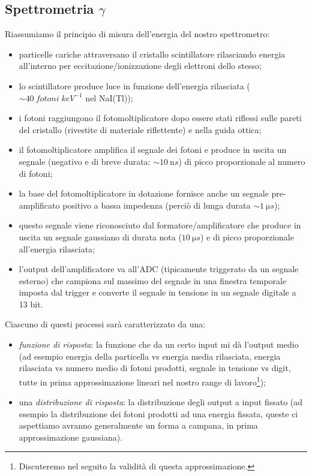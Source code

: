 \subsection{Spettrometria $\gamma$}
Riassumiamo il principio di misura dell'energia del nostro spettrometro:
\begin{itemize}
	\item particelle cariche attraversano il cristallo scintillatore rilasciando energia all'interno per eccitazione/ionizzazione degli elettroni dello stesso;
	\item lo scintillatore produce luce in funzione dell'energia rilasciata ($\sim \SI{40}{fotoni \; keV^{-1}}$ nel NaI(Tl));
	\item i fotoni raggiungono il fotomoltiplicatore dopo essere stati riflessi sulle pareti del cristallo (rivestite di materiale riflettente) e nella guida ottica;
	\item il fotomoltiplicatore amplifica il segnale dei fotoni e produce in uscita un segnale (negativo e di breve durata: $\sim \SI{10}{\nano s}$) di picco proporzionale al numero di fotoni;
	\item la base del fotomoltiplicatore in dotazione fornisce anche un segnale pre-amplificato positivo a bassa impedenza (perciò di lunga durata $\sim \SI{1}{\micro s}$);
	\item questo segnale viene riconosciuto dal formatore/amplificatore che produce in uscita un segnale gaussiano di durata nota ($\SI{10}{\micro s}$) e di picco proporzionale all'energia rilasciata;
	\item l'output dell'amplificatore va all'ADC (tipicamente triggerato da un segnale esterno) che campiona sul massimo del segnale in una finestra temporale imposta dal trigger e converte il segnale in tensione in un segnale digitale a 13 bit.
\end{itemize}
Ciascuno di questi processi sarà caratterizzato da una:
\begin{itemize}
	\item\emph{funzione di risposta}: la funzione che da un certo input mi dà l'output medio (ad esempio energia della particella vs energia media rilasciata, energia rilasciata vs numero medio di fotoni prodotti, segnale in tensione vs digit, tutte in prima approssimazione lineari nel nostro range di lavoro\footnote{Discuteremo nel seguito la validità di questa approssimazione.});
    \item una \emph{distribuzione di risposta}: la distribuzione degli output a input fissato (ad esempio la distribuzione dei fotoni prodotti ad una energia fissata, queste ci aspettiamo avranno generalmente un forma a campana, in prima approssimazione gaussiana).
\end{itemize}

